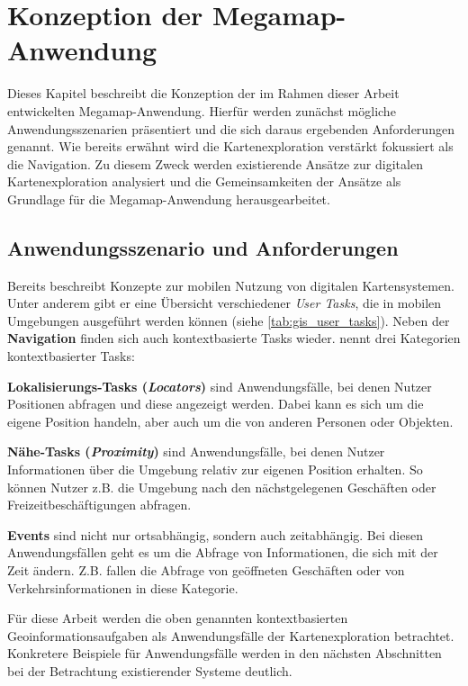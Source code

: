 \chapter{Konzeption der Megamap-Anwendung}
\label{chap:concept}
Dieses Kapitel beschreibt die Konzeption der im Rahmen dieser Arbeit entwickelten Megamap-Anwendung.
Hierfür werden zunächst mögliche Anwendungsszenarien präsentiert und die sich daraus ergebenden Anforderungen genannt.
Wie bereits erwähnt wird die Kartenexploration verstärkt fokussiert als die Navigation.
Zu diesem Zweck werden existierende Ansätze zur digitalen Kartenexploration analysiert und die Gemeinsamkeiten der Ansätze als Grundlage für die Megamap-Anwendung herausgearbeitet.

\section{Anwendungsszenario und Anforderungen}
\label{sec:reichenbacher_use_cases}
Bereits \textcite{Reichenbacher2001} beschreibt Konzepte zur mobilen Nutzung von digitalen Kartensystemen.
Unter anderem gibt er eine Übersicht verschiedener \emph{User Tasks}, die in mobilen Umgebungen ausgeführt werden können (siehe \autoref{tab:gis_user_tasks}).
Neben der \textbf{Navigation} finden sich auch kontextbasierte Tasks wieder.
\citeauthor{Reichenbacher2001} nennt drei Kategorien kontextbasierter Tasks:

\textbf{Lokalisierungs-Tasks (\emph{Locators})} sind Anwendungsfälle, bei denen Nutzer Positionen abfragen und diese angezeigt werden.
Dabei kann es sich um die eigene Position handeln, aber auch um die von anderen Personen oder Objekten.

\textbf{Nähe-Tasks (\emph{Proximity})} sind Anwendungsfälle, bei denen Nutzer Informationen über die Umgebung relativ zur eigenen Position erhalten.
So können Nutzer z.B. die Umgebung nach den nächstgelegenen Geschäften oder Freizeitbeschäftigungen abfragen.

\textbf{Events} sind nicht nur ortsabhängig, sondern auch zeitabhängig.
Bei diesen Anwendungsfällen geht es um die Abfrage von Informationen, die sich mit der Zeit ändern.
Z.B. fallen die Abfrage von geöffneten Geschäften oder von Verkehrsinformationen in diese Kategorie.

Für diese Arbeit werden die oben genannten kontextbasierten Geoinformationsaufgaben als Anwendungsfälle der Kartenexploration betrachtet.
Konkretere Beispiele für Anwendungsfälle werden in den nächsten Abschnitten bei der Betrachtung existierender Systeme deutlich.

